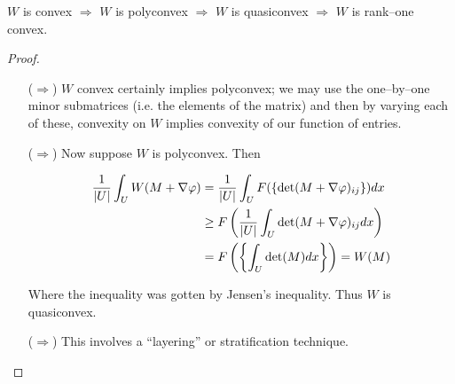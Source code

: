 \documentclass[../main.tex]{subfiles}
\begin{document}
\begin{thm}
	$W$ is convex $\Rightarrow$ $W$ is polyconvex $\Rightarrow$ $W$ is quasiconvex $\Rightarrow$ $W$ is rank--one convex.
\end{thm}

\begin{proof}


	\begin{itemize}
		\item[($\Rightarrow$)]   $W$ convex certainly implies polyconvex; we may use the one--by--one minor submatrices (i.e. the elements of the matrix) and then by varying each of these, convexity on $W$ implies convexity of our function of entries.
		\item[($\Rightarrow$)] Now suppose $W$ is polyconvex.
			Then

			\begin{align*}
				\frac{1}{\lvert U\rvert} \int_U W(M + \nabla \varphi) & = \frac{1}{\lvert U\rvert} \int_U F( \{\mathrm{det}( M + \nabla \varphi)_{ij}\} ) dx         \\
				                                               & \geq F\left( \frac{1}{\lvert U\rvert} \int_U \mathrm{det} (M + \nabla \varphi)_{ij} dx \right) \\
				                                               & = F \left( \left\{ \int_U \mathrm{det} (M) dx \right\} \right) = W(M)
			\end{align*}

			Where the inequality was gotten by Jensen's inequality.
			Thus $W$ is quasiconvex.


		\item[($\Rightarrow$)] This involves a ``layering'' or stratification technique. 

	\end{itemize}



\end{proof}


\printbibliography
\end{document}
